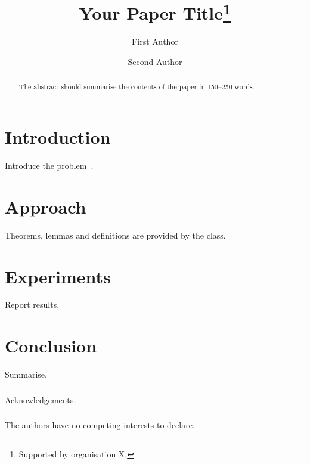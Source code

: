 \documentclass[runningheads]{llncs}
\begin{document}
\title{Your Paper Title\thanks{Supported by organisation X.}}

\author{First Author \and
Second Author}


\maketitle

\begin{abstract}
The abstract should summarise the contents of the paper in 150--250 words.
\end{abstract}

\section{Introduction}
Introduce the problem~\cite{knuth1984}.

\section{Approach}
\begin{theorem}
Theorems, lemmas and definitions are provided by the class.
\end{theorem}

\section{Experiments}
Report results.

\section{Conclusion}
Summarise.

\begin{credits}
\subsubsection{\ackname} Acknowledgements.

\subsubsection{\discintname}
The authors have no competing interests to declare.
\end{credits}



\end{document}
